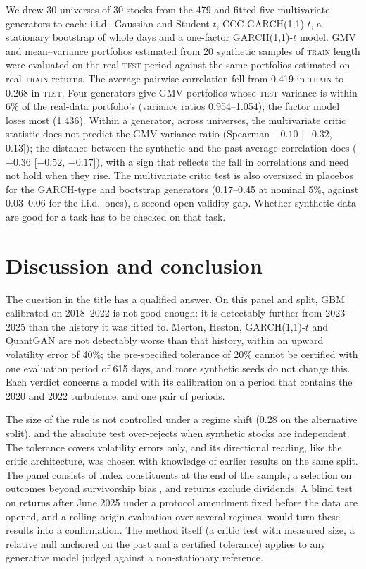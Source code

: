 \documentclass[11pt,a4paper]{article}
\theoremstyle{plain}
\newcommand{\TRAIN}{\textsc{train}}
\newcommand{\TEST}{\textsc{test}}
\newcommand{\GARCHt}{GARCH(1,1)-$t$}
\begin{document}
We drew 30 universes of 30 stocks from the 479 and fitted five multivariate generators to each:
i.i.d.\ Gaussian and Student-$t$, CCC-\GARCHt, a stationary bootstrap of whole days and a one-factor
\GARCHt{} model. GMV and mean--variance portfolios \citep{markowitz1952portfolio} estimated from 20
synthetic samples of \TRAIN{} length were evaluated on the real \TEST{} period against the same
portfolios estimated on real \TRAIN{} returns. The average pairwise correlation fell from 0.419 in
\TRAIN{} to 0.268 in \TEST. Four generators give GMV portfolios whose \TEST{} variance is within 6\%
of the real-data portfolio's (variance ratios 0.954--1.054); the factor model loses most (1.436).
Within a generator, across universes, the multivariate critic statistic does not predict the GMV
variance ratio (Spearman $-0.10$ [$-0.32$, 0.13]); the distance between the synthetic and the past
average correlation does ($-0.36$ [$-0.52$, $-0.17$]), with a sign that reflects the fall in
correlations and need not hold when they rise. The multivariate critic test is also oversized in placebos for the
GARCH-type and bootstrap generators (0.17--0.45 at nominal 5\%, against 0.03--0.06 for the i.i.d.\
ones), a second open validity gap. Whether synthetic data are good for a task has to be checked on
that task.

\section{Discussion and conclusion}\label{sec:concl}

The question in the title has a qualified answer. On this panel and split, GBM calibrated on
2018--2022 is not good enough: it is detectably further from 2023--2025 than the history it was
fitted to. Merton, Heston, \GARCHt{} and QuantGAN are not detectably worse than that history, within
an upward volatility error of 40\%; the pre-specified tolerance of 20\% cannot be certified with one
evaluation period of 615 days, and more synthetic seeds do not change this. Each verdict concerns a
model with its calibration on a period that contains the 2020 and 2022 turbulence, and one
pair of periods.

The size of the rule is not controlled under a regime shift (0.28 on the alternative split), and the absolute test over-rejects when synthetic stocks are
independent. The tolerance covers volatility errors only, and its directional reading, like the
critic architecture, was chosen with knowledge of earlier results on the same split. The panel
consists of index constituents at the end of the sample, a selection on outcomes beyond
survivorship bias \citep{brown1992survivorship}, and returns exclude dividends. A blind test on
returns after June 2025 under a protocol amendment fixed before the data are opened, and a
rolling-origin evaluation over several regimes, would turn these results into a confirmation. The
method itself (a critic test with measured size, a relative null anchored on the past and a
certified tolerance) applies to any generative model judged against a non-stationary reference.



\end{document}
